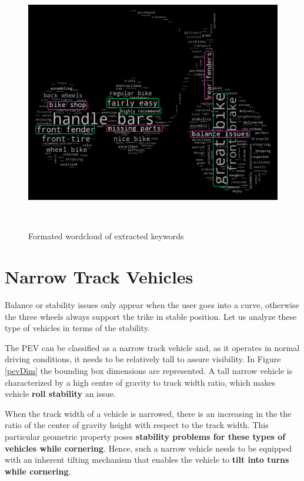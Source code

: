 \begin{figure}[t]
	\includegraphics[width=1\linewidth]{pdf/Amazon/Amazon_clean_files/Amazon_clean_6_1}
	\caption{Formated wordcloud of extracted keywords}
	\label{wordcloud2}
	\\[-1cm]
\end{figure}

\section{Narrow Track Vehicles}

Balance or stability issues only appear when the user goes into a curve, otherwise the three wheels always support the trike in stable position. Let us analyze these type of vehicles in terms of the stability.

The PEV can be classified as a narrow track vehicle and, as it operates in normal driving conditions, it needs to be relatively tall to assure visibility. In Figure \ref{pevDim} the bounding box dimensions are represented. A tall narrow vehicle is characterized by a high centre of gravity to track width ratio, which makes vehicle \textbf{roll stability} an issue\cite{Saeedi}\cite{festini2011urban}.

When the track width of a vehicle is narrowed, there is an increasing in the the ratio of the center of gravity height with respect to the track width. This particular geometric property poses \textbf{stability problems for these types of vehicles while cornering}. Hence, such a narrow vehicle needs to be equipped with an inherent tilting mechanism that enables the vehicle to \textbf{tilt into turns while cornering}\cite{nurse2015tilting}. 

